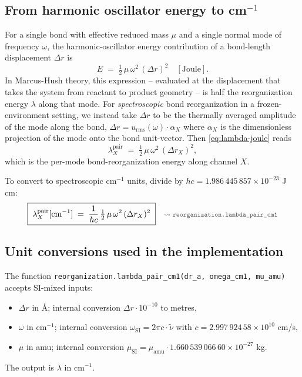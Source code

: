 \documentclass[10pt,a4paper,twoside]{article}
\newcommand{\urms}{u_{\mathrm{rms}}}
\newcommand{\codref}[1]{%
  \quad\text{\textcolor{gray!70!black}{\footnotesize $\rightsquigarrow$~\texttt{#1}}}}
\newcommand{\fn}[1]{\texttt{#1}}
\begin{document}
\subsection{From harmonic oscillator energy to cm$^{-1}$}

\codref{reorganization.lambda\_pair\_cm1}

For a single bond with effective reduced mass $\mu$ and a single
normal mode of frequency $\omega$, the harmonic-oscillator energy
contribution of a bond-length displacement $\Delta r$ is
\begin{equation}
  E \;=\; \tfrac{1}{2}\,\mu\,\omega^2\,(\Delta r)^2 \quad [\text{Joule}].
  \label{eq:lambda-joule}
\end{equation}
In Marcus-Hush theory, this expression -- evaluated at the
displacement that takes the system from reactant to product
geometry -- is half the reorganization energy
$\lambda$ along that mode. For \emph{spectroscopic} bond
reorganization in a frozen-environment setting, we instead take
$\Delta r$ to be the thermally averaged amplitude of the mode
along the bond, $\Delta r = \urms(\omega) \cdot \alpha_X$ where
$\alpha_X$ is the dimensionless projection of the mode onto the
bond unit-vector. Then \cref{eq:lambda-joule} reads
\begin{equation}
  \lambda_X^{\text{pair}}
    \;=\;
  \tfrac{1}{2}\,\mu\,\omega^2\,(\Delta r_X)^2,
  \label{eq:lambda-joule-channel}
\end{equation}
which is the per-mode bond-reorganization energy along channel $X$.

To convert to spectroscopic cm$^{-1}$ units, divide by
$hc = 1.986\,445\,857 \times 10^{-23}$ J cm:
\begin{equation}
  \boxed{\;\lambda_X^{\text{pair}}[\text{cm}^{-1}]
    \;=\;
  \frac{1}{hc}\,\tfrac{1}{2}\,\mu\,\omega^2\,(\Delta r_X)^2\;}
  \codref{reorganization.lambda\_pair\_cm1}
  \label{eq:lambda-cm1}
\end{equation}

\subsection{Unit conversions used in the implementation}

The function \fn{reorganization.lambda\_pair\_cm1(dr\_a,
omega\_cm1, mu\_amu)} accepts SI-mixed inputs:
\begin{itemize}
  \item $\Delta r$ in \AA{}; internal conversion $\Delta r \cdot
        10^{-10}$ to metres,
  \item $\omega$ in cm$^{-1}$; internal conversion
        $\omega_\text{SI} = 2\pi c \cdot \tilde\nu$ with
        $c = 2.997\,924\,58 \times 10^{10}$ cm/s,
  \item $\mu$ in amu; internal conversion $\mu_\text{SI} =
        \mu_\text{amu} \cdot 1.660\,539\,066\,60 \times 10^{-27}$
        kg.
\end{itemize}
The output is $\lambda$ in cm$^{-1}$.
\end{document}
